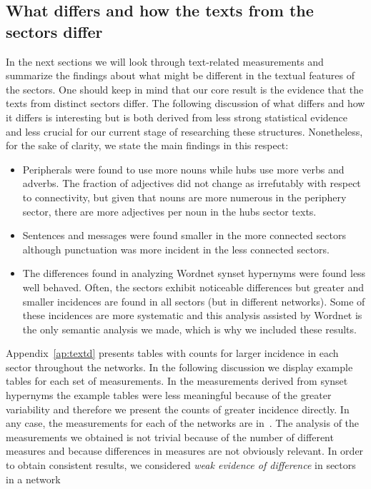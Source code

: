  \subsection{What differs and how the texts from the sectors differ}
 In the next sections we will look through text-related measurements
 and summarize the findings about what might be different in
 the textual features of the sectors.
 One should keep in mind that our core result is the evidence that
 the texts from distinct sectors differ.
 The following discussion of what differs and how it differs
 is interesting but is both derived from less strong statistical evidence and less crucial for our current stage of researching these structures.
 Nonetheless, for the sake of clarity, we state the main findings in this respect:
 \begin{itemize}
\item Peripherals were found to use more nouns while hubs use more verbs and adverbs. The fraction of adjectives did not change as irrefutably with respect to connectivity, but given that nouns are more numerous in the periphery sector, there are more adjectives per noun in the hubs sector texts.
\item Sentences and messages were found smaller in the more connected sectors although punctuation was more incident in the less connected sectors.
\item The differences found in analyzing Wordnet synset hypernyms were found less well behaved. Often, the sectors exhibit noticeable differences but greater and smaller incidences are found in all sectors (but in different networks). Some of these incidences are more systematic and this analysis assisted by Wordnet is the only semantic analysis we made, which is why we included these results.
\end{itemize}
Appendix~\ref{ap:textd} presents tables with counts for larger incidence in each sector throughout the networks. In the following discussion we display example tables for each set of measurements.
In the measurements derived from synset hypernyms the example tables were less meaningful because of the greater variability and therefore we present the counts of greater incidence directly.
In any case, the measurements for each of the networks are in~\cite{textTables}.
The analysis of the measurements we obtained
is not trivial because of the number of different measures
and because differences in measures are not obviously relevant.
In order to obtain consistent results, we considered \emph{weak evidence of difference} in sectors in a network
